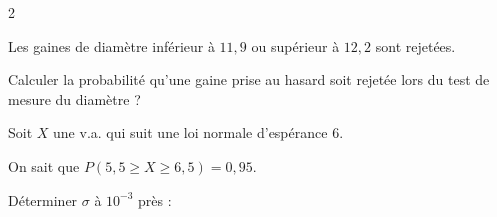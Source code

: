\begin{multicols}{2}
\begin{exercice_cours}[\quad]{}
Les gaines de diamètre inférieur à $11,9$ ou supérieur à $12,2$ sont rejetées.

Calculer la probabilité qu'une gaine prise au hasard soit rejetée lors du test de mesure du diamètre ?


\end{exercice_cours}
\begin{exercice_cours}[\quad]{}


Soit $X$ une v.a. qui suit une loi normale d'espérance $6$.

On sait que $P(5,5\geq X\geq6,5)= 0,95$.

Déterminer $\sigma$ à $10^{-3}$ près : \dotfill


\end{exercice_cours}


\end{multicols}	